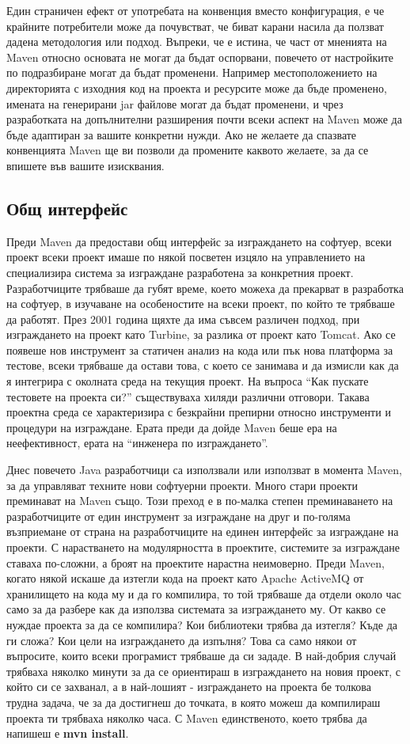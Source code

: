Един страничен ефект от употребата на конвенция вместо конфигурация, е
че крайните потребители може да почувстват, че биват карани насила да
ползват дадена методология или подход. Въпреки, че е истина, че част
от мненията на Maven относно основата не могат да бъдат оспорвани,
повечето от настройките по подразбиране могат да бъдат
променени. Например местоположението на директорията с изходния код на
проекта и ресурсите може да бъде променено, имената на генерирани jar
файлове могат да бъдат променени, и чрез разработката на допълнителни
разширения почти всеки аспект на Maven може да бъде адаптиран за
вашите конкретни нужди. Ако не желаете да спазвате конвенцията Maven
ще ви позволи да промените каквото желаете, за да се впишете във
вашите изисквания. 
\subsection{Общ интерфейс}
Преди Maven да предостави общ интерфейс за изграждането на софтуер,
всеки проект всеки проект имаше по някой посветен изцяло на
управлението на специализира система за изграждане разработена за
конкретния проект. Разработчиците трябваше да губят време, което
можеха да прекарват в разработка на софтуер, в изучаване на
особеностите на всеки проект, по който те трябваше да работят. През
2001 година щяхте да има съвсем различен подход, при изграждането на
проект като Turbine, за разлика от проект като Tomcat. Ако се появеше
нов инструмент за статичен анализ на кода или пък нова платформа за
тестове, всеки трябваше да остави това, с което се занимава и да
измисли как да я интегрира с околната среда на текущия проект. На
въпроса "`Как пускате тестовете на проекта си?"' съществуваха хиляди
различни отговори. Такава проектна среда се характеризира с безкрайни
препирни относно инструменти и процедури на изграждане. Ерата преди да
дойде Maven беше ера на неефективност, ерата на "`инженера по
изграждането"'.

Днес повечето Java разработчици са използвали или използват в момента
Maven, за да управляват техните нови софтуерни проекти. Много стари
проекти преминават на Maven също. Този преход е в по-малка степен
преминаването на разработчиците от един инструмент за изграждане на
друг и по-голяма възприемане от страна на разработчиците на единен
интерфейс за изграждане на проекти. С нарастването на модулярността в
проектите, системите за изграждане ставаха по-сложни, а броят на
проектите нарастна неимоверно. Преди Maven, когато някой искаше да
изтегли кода на проект като Apache ActiveMQ от хранилището на кода му
и да го компилира, то той трябваше да отдели около час само за да
разбере как да използва системата за изграждането му. От какво се
нуждае проекта за да се компилира? Кои библиотеки трябва да изтегля?
Къде да ги сложа? Кои цели на изграждането да изпълня? Това са само
някои от въпросите, които всеки програмист трябваше да си зададе. В
най-добрия случай трябваха няколко минути за да се ориентираш в
изграждането на новия проект, с който си се захванал, а в най-лошият -
изграждането на проекта бе толкова трудна задача, че за да достигнеш
до точката, в която можеш да компилираш проекта ти трябваха няколко
часа. С Maven единственото, което трябва да напишеш е \textbf{mvn
  install}.

